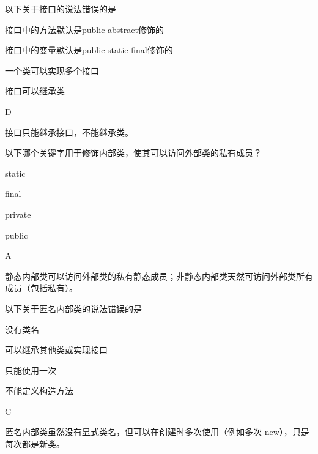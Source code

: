 \begin{question}
	以下关于接口的说法错误的是
	\begin{options}
		\item 接口中的方法默认是public abstract修饰的
		\item 接口中的变量默认是public static final修饰的
		\item 一个类可以实现多个接口
		\item 接口可以继承类
	\end{options}
	\begin{answer}
		D
	\end{answer}
	\begin{explanation}
		接口只能继承接口，不能继承类。
	\end{explanation}
\end{question}

\begin{question}
	以下哪个关键字用于修饰内部类，使其可以访问外部类的私有成员？
	\begin{options}
		\item static
		\item final
		\item private
		\item public
	\end{options}
	\begin{answer}
		A
	\end{answer}
	\begin{explanation}
		静态内部类可以访问外部类的私有静态成员；非静态内部类天然可访问外部类所有成员（包括私有）。
	\end{explanation}
\end{question}

\begin{question}
	以下关于匿名内部类的说法错误的是
	\begin{options}
		\item 没有类名
		\item 可以继承其他类或实现接口
		\item 只能使用一次
		\item 不能定义构造方法
	\end{options}
	\begin{answer}
		C
	\end{answer}
	\begin{explanation}
		匿名内部类虽然没有显式类名，但可以在创建时多次使用（例如多次 new），只是每次都是新类。
	\end{explanation}
\end{question}


